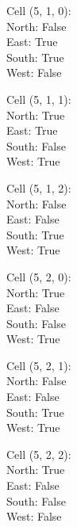 \documentclass{article}
\begin{document}
\begin{multicols*}{3}
Cell (5, 1, 0):\\
\-\hspace{2cm}North: False\\
\-\hspace{2cm}East: True\\
\-\hspace{2cm}South: True\\
\-\hspace{2cm}West: False

Cell (5, 1, 1):\\
\-\hspace{2cm}North: True\\
\-\hspace{2cm}East: True\\
\-\hspace{2cm}South: False\\
\-\hspace{2cm}West: True

Cell (5, 1, 2):\\
\-\hspace{2cm}North: False\\
\-\hspace{2cm}East: False\\
\-\hspace{2cm}South: True\\
\-\hspace{2cm}West: True

Cell (5, 2, 0):\\
\-\hspace{2cm}North: True\\
\-\hspace{2cm}East: False\\
\-\hspace{2cm}South: False\\
\-\hspace{2cm}West: True

Cell (5, 2, 1):\\
\-\hspace{2cm}North: False\\
\-\hspace{2cm}East: False\\
\-\hspace{2cm}South: True\\
\-\hspace{2cm}West: True

Cell (5, 2, 2):\\
\-\hspace{2cm}North: True\\
\-\hspace{2cm}East: False\\
\-\hspace{2cm}South: False\\
\-\hspace{2cm}West: False

\end{multicols*}
\end{document}
